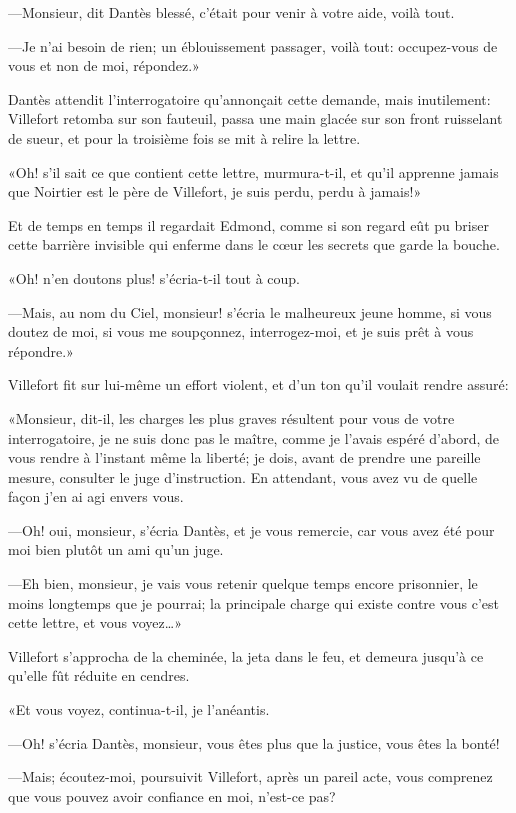 —Monsieur, dit Dantès blessé, c'était pour venir à votre aide, voilà tout.

—Je n'ai besoin de rien; un éblouissement passager, voilà tout: occupez-vous de vous et non de moi, répondez.»

Dantès attendit l'interrogatoire qu'annonçait cette demande, mais inutilement: Villefort retomba sur son fauteuil, passa une main glacée sur son front ruisselant de sueur, et pour la troisième fois se mit à relire la lettre.

«Oh! s'il sait ce que contient cette lettre, murmura-t-il, et qu'il apprenne jamais que Noirtier est le père de Villefort, je suis perdu, perdu à jamais!»

Et de temps en temps il regardait Edmond, comme si son regard eût pu briser cette barrière invisible qui enferme dans le cœur les secrets que garde la bouche.

«Oh! n'en doutons plus! s'écria-t-il tout à coup.

—Mais, au nom du Ciel, monsieur! s'écria le malheureux jeune homme, si vous doutez de moi, si vous me soupçonnez, interrogez-moi, et je suis prêt à vous répondre.»

Villefort fit sur lui-même un effort violent, et d'un ton qu'il voulait rendre assuré:

«Monsieur, dit-il, les charges les plus graves résultent pour vous de votre interrogatoire, je ne suis donc pas le maître, comme je l'avais espéré d'abord, de vous rendre à l'instant même la liberté; je dois, avant de prendre une pareille mesure, consulter le juge d'instruction. En attendant, vous avez vu de quelle façon j'en ai agi envers vous.

—Oh! oui, monsieur, s'écria Dantès, et je vous remercie, car vous avez été pour moi bien plutôt un ami qu'un juge.

—Eh bien, monsieur, je vais vous retenir quelque temps encore prisonnier, le moins longtemps que je pourrai; la principale charge qui existe contre vous c'est cette lettre, et vous voyez\dots»

Villefort s'approcha de la cheminée, la jeta dans le feu, et demeura jusqu'à ce qu'elle fût réduite en cendres.

«Et vous voyez, continua-t-il, je l'anéantis.

—Oh! s'écria Dantès, monsieur, vous êtes plus que la justice, vous êtes la bonté!

—Mais; écoutez-moi, poursuivit Villefort, après un pareil acte, vous comprenez que vous pouvez avoir confiance en moi, n'est-ce pas?

